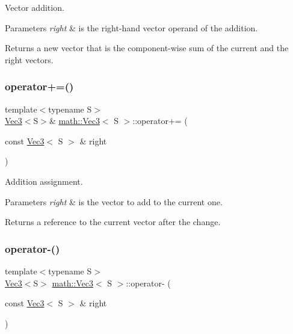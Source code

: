 Vector addition.


\begin{DoxyParams}{Parameters}
{\em right} & is the right-\/hand vector operand of the addition.\\
\hline
\end{DoxyParams}
\begin{DoxyReturn}{Returns}
a new vector that is the component-\/wise sum of the current and the right vectors. 
\end{DoxyReturn}
\mbox{\label{classmath_1_1_vec3_abd59720702df202ce59c5d5de5901f4b}} 
\subsubsection{\texorpdfstring{operator+=()}{operator+=()}}
{\footnotesize\ttfamily template$<$typename S$>$ \\
\hyperlink{classmath_1_1_vec3}{Vec3}$<$S$>$\& \hyperlink{classmath_1_1_vec3}{math\+::\+Vec3}$<$ S $>$\+::operator+= (\begin{DoxyParamCaption}\item[{const \hyperlink{classmath_1_1_vec3}{Vec3}$<$ S $>$ \&}]{right }\end{DoxyParamCaption})\hspace{0.3cm}{\ttfamily [inline]}}

Addition assignment.


\begin{DoxyParams}{Parameters}
{\em right} & is the vector to add to the current one.\\
\hline
\end{DoxyParams}
\begin{DoxyReturn}{Returns}
a reference to the current vector after the change. 
\end{DoxyReturn}
\mbox{\label{classmath_1_1_vec3_a0a0ac5cc4b2e39cf68adc28442747651}} 
\subsubsection{\texorpdfstring{operator-\/()}{operator-()}}
{\footnotesize\ttfamily template$<$typename S$>$ \\
\hyperlink{classmath_1_1_vec3}{Vec3}$<$S$>$ \hyperlink{classmath_1_1_vec3}{math\+::\+Vec3}$<$ S $>$\+::operator-\/ (\begin{DoxyParamCaption}\item[{const \hyperlink{classmath_1_1_vec3}{Vec3}$<$ S $>$ \&}]{right }\end{DoxyParamCaption})\hspace{0.3cm}{\ttfamily [inline]}}

